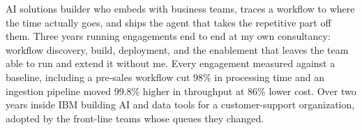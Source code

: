 \documentclass[11pt,a4paper,sans]{moderncv}
\begin{document}
\makecvtitle


\vspace{6pt}
\small{AI solutions builder who embeds with business teams, traces a workflow to where the time actually goes, and ships the agent that takes the repetitive part off them. Three years running engagements end to end at my own consultancy: workflow discovery, build, deployment, and the enablement that leaves the team able to run and extend it without me. Every engagement measured against a baseline, including a pre-sales workflow cut 98\% in processing time and an ingestion pipeline moved 99.8\% higher in throughput at 86\% lower cost. Over two years inside IBM building AI and data tools for a customer-support organization, adopted by the front-line teams whose queues they changed.}

\end{document}
